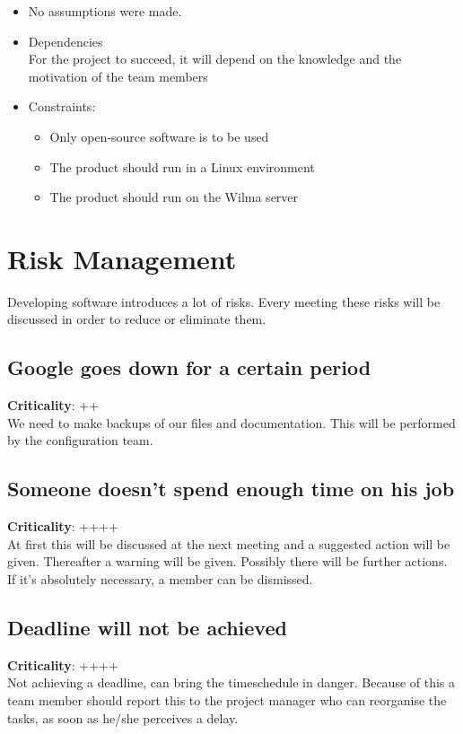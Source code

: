 \documentclass[a4paper, 12pt]{report}
\begin{document}
			\begin{itemize}
				
				\item No assumptions were made.
				
				\item Dependencies \\
 					  For the project to succeed, it will depend on
					  the knowledge and the motivation of the team members	
				
				\item Constraints:
				\begin{itemize}
					\item Only open-source software is to be used
					\item The product should run in a Linux environment
					\item The product should run on the Wilma server
				\end{itemize}
				
			\end{itemize}	
			
		\section{Risk Management}
			
			Developing software introduces a lot of risks. Every meeting these risks will
			be discussed in order to reduce or eliminate them. 
			
			\subsection{Google goes down for a certain period}
			\textbf{Criticality}: ++ \\
			We need to make backups of our files and documentation. This will be 
			performed by the configuration team.
			
			\subsection{Someone doesn't spend enough time on his job}
			\textbf{Criticality}: ++++ \\
			At first this will be discussed at the next meeting and a suggested action 
			will be given. Thereafter a warning will be given. Possibly there will be 
			further actions. If it’s absolutely necessary, a member can be dismissed.
			
			\subsection{Deadline will not be achieved}
			\textbf{Criticality}: ++++ \\
			Not achieving a deadline, can bring the timeschedule in danger. Because of
			this a team member should report this to the project manager
			who can reorganise the tasks, as soon as he/she perceives a delay.  
			
\end{document}
